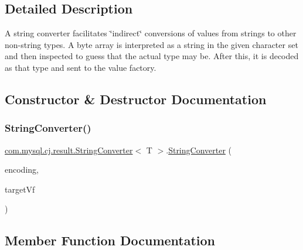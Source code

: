 \subsection{Detailed Description}
A string converter facilitates \char`\"{}indirect\char`\"{} conversions of values from strings to other non-\/string types. A byte array is interpreted as a string in the given character set and then inspected to guess that the actual type may be. After this, it is decoded as that type and sent to the value factory. 

\subsection{Constructor \& Destructor Documentation}
\mbox{\label{classcom_1_1mysql_1_1cj_1_1result_1_1_string_converter_aa40363fd36257ba577e49dfc3d9b26d4}} 
\subsubsection{\texorpdfstring{String\+Converter()}{StringConverter()}}
{\footnotesize\ttfamily \mbox{\hyperlink{classcom_1_1mysql_1_1cj_1_1result_1_1_string_converter}{com.\+mysql.\+cj.\+result.\+String\+Converter}}$<$ T $>$.\mbox{\hyperlink{classcom_1_1mysql_1_1cj_1_1result_1_1_string_converter}{String\+Converter}} (\begin{DoxyParamCaption}\item[{String}]{encoding,  }\item[{\mbox{\hyperlink{interfacecom_1_1mysql_1_1cj_1_1result_1_1_value_factory}{Value\+Factory}}$<$ T $>$}]{target\+Vf }\end{DoxyParamCaption})}



\subsection{Member Function Documentation}
\mbox{\label{classcom_1_1mysql_1_1cj_1_1result_1_1_string_converter_a328be706c2bb9de113338b42cb20d8c6}} 
